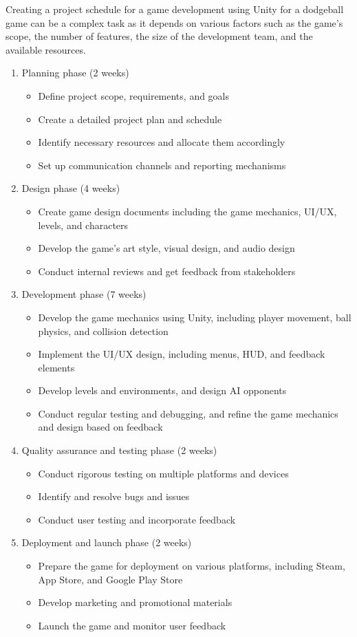 \documentclass[12pt]{report}
\begin{document}
\justifying
\setlength{\parindent}{4em}
\setlength{\parskip}{0.5em}
\renewcommand{\baselinestretch}{1.5}
\hspace{1.5cm} Creating a project schedule for a game development using Unity for a dodgeball game can be a complex task as it depends on various factors such as the game's scope, the number of features, the size of the development team, and the available resources. 
\begin{enumerate} 
\item Planning phase (2 weeks)
\begin{itemize}
\item Define project scope, requirements, and goals
\item Create a detailed project plan and schedule
\item Identify necessary resources and allocate them accordingly
\item Set up communication channels and reporting mechanisms
\end{itemize}
\item Design phase (4 weeks)
\begin{itemize}
\item Create game design documents including the game mechanics, UI/UX, levels, and characters
\item Develop the game's art style, visual design, and audio design
\item Conduct internal reviews and get feedback from stakeholders
\end{itemize}
\item Development phase (7 weeks)
\begin{itemize}
\item Develop the game mechanics using Unity, including player movement, ball physics, and collision detection
\item Implement the UI/UX design, including menus, HUD, and feedback elements
\item Develop levels and environments, and design AI opponents
\item Conduct regular testing and debugging, and refine the game mechanics and design based on feedback
\end{itemize}
\item Quality assurance and testing phase (2 weeks)
\begin{itemize}
\item Conduct rigorous testing on multiple platforms and devices
\item Identify and resolve bugs and issues
\item Conduct user testing and incorporate feedback
\end{itemize}
\item Deployment and launch phase (2 weeks)
\begin{itemize}
\item Prepare the game for deployment on various platforms, including Steam, App Store, and Google Play Store
\item Develop marketing and promotional materials
\item Launch the game and monitor user feedback
\end{itemize}
\end{enumerate}
\end{document}

